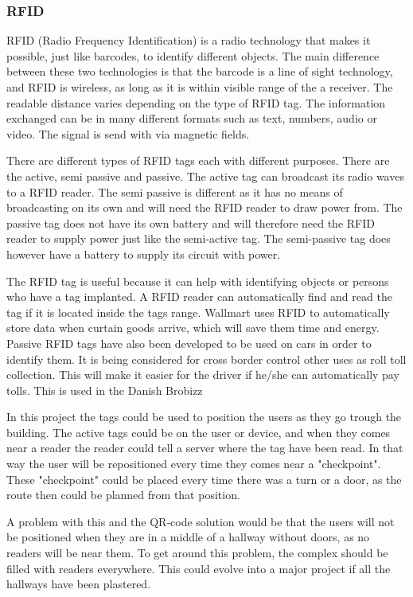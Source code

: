 \subsubsection{RFID}

RFID (Radio Frequency Identification) is a radio technology that makes it possible, just like barcodes, to identify different objects. The main difference between these two technologies is that the barcode is a line of sight technology, and RFID is wireless, as long as it is within visible range of the a receiver. The readable distance varies depending on the type of RFID tag. The information exchanged can be in many different formats such as text, numbers, audio or video. The signal is send with via magnetic fields\cite{RFID_magnetic}.

There are different types of RFID tags each with different purposes. There are the active, semi passive and passive. The active tag can broadcast its radio waves to a RFID reader. The semi passive is different as it has no means of broadcasting on its own and will need the RFID reader to draw power from\cite{RFID_semiActive}. The passive tag does not have its own battery and will therefore need the RFID reader to supply power just like the semi-active tag. The semi-passive tag does however have a battery to supply its circuit with power\cite{RFID_AllTypes}.

The RFID tag is useful because it can help with identifying objects or persons who have a tag implanted\cite{RFID_FAQ}. A RFID reader can automatically find and read the tag if it is located inside the tags range. Wallmart uses RFID to automatically store data when curtain goods arrive, which will save them time and energy\cite{RFiD_inc}. Passive RFID tags have also been developed to be used on cars in order to identify them. It is being considered for cross border control other uses as roll toll collection\cite{RFID_car}. This will make it easier for the driver if he/she can automatically pay tolls. This is used in the Danish Brobizz\cite{RFID_brobizz}   

In this project the tags could be used to position the users as they go trough the building. The active tags could be on the user or device, and when they comes near a reader the reader could tell a server where the tag have been read. In that way the user will be repositioned every time they comes near a "checkpoint". These "checkpoint" could be placed every time there was a turn or a door, as the route then could be planned from that position.

A problem with this and the QR-code solution would be that the users will not be positioned when they are in a middle of a hallway without doors, as no readers will be near them. To get around this problem, the complex should be filled with readers everywhere. This could evolve into a major project if all the hallways have been plastered.



